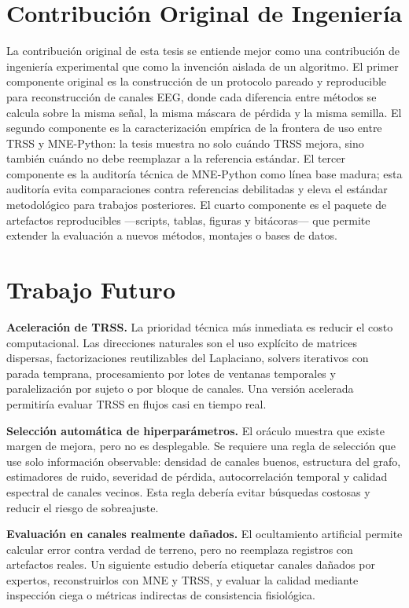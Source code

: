 

\section{Contribución Original de Ingeniería}

La contribución original de esta tesis se entiende mejor como una contribución de ingeniería experimental que como la invención aislada de un algoritmo. El primer componente original es la construcción de un protocolo pareado y reproducible para reconstrucción de canales EEG, donde cada diferencia entre métodos se calcula sobre la misma señal, la misma máscara de pérdida y la misma semilla. El segundo componente es la caracterización empírica de la frontera de uso entre TRSS y MNE-Python: la tesis muestra no solo cuándo TRSS mejora, sino también cuándo no debe reemplazar a la referencia estándar. El tercer componente es la auditoría técnica de MNE-Python como línea base madura; esta auditoría evita comparaciones contra referencias debilitadas y eleva el estándar metodológico para trabajos posteriores. El cuarto componente es el paquete de artefactos reproducibles —scripts, tablas, figuras y bitácoras— que permite extender la evaluación a nuevos métodos, montajes o bases de datos.

\section{Trabajo Futuro}

\textbf{Aceleración de TRSS.} La prioridad técnica más inmediata es reducir el costo computacional. Las direcciones naturales son el uso explícito de matrices dispersas, factorizaciones reutilizables del Laplaciano, solvers iterativos con parada temprana, procesamiento por lotes de ventanas temporales y paralelización por sujeto o por bloque de canales. Una versión acelerada permitiría evaluar TRSS en flujos casi en tiempo real.

\textbf{Selección automática de hiperparámetros.} El oráculo muestra que existe margen de mejora, pero no es desplegable. Se requiere una regla de selección que use solo información observable: densidad de canales buenos, estructura del grafo, estimadores de ruido, severidad de pérdida, autocorrelación temporal y calidad espectral de canales vecinos. Esta regla debería evitar búsquedas costosas y reducir el riesgo de sobreajuste.

\textbf{Evaluación en canales realmente dañados.} El ocultamiento artificial permite calcular error contra verdad de terreno, pero no reemplaza registros con artefactos reales. Un siguiente estudio debería etiquetar canales dañados por expertos, reconstruirlos con MNE y TRSS, y evaluar la calidad mediante inspección ciega o métricas indirectas de consistencia fisiológica.

